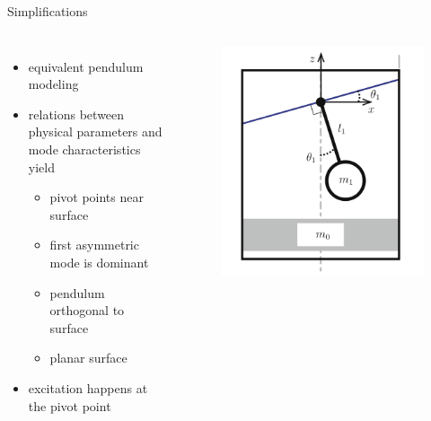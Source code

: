 \documentclass[de]{sdqbeamer}
\begin{document}

\begin{frame}{Simplifications}
    \begin{columns}
        \begin{itemize}
            \item equivalent pendulum modeling
            \item relations between physical parameters and mode characteristics yield
            \begin{itemize}
                \item pivot points near surface
                \item first asymmetric mode is dominant
                \item pendulum orthogonal to surface
                \item planar surface
            \end{itemize} 
            \item excitation happens at the pivot point
        \end{itemize}        
        \begin{figure}
            \centering
            \includegraphics[scale=0.23]{graphics/sloshing_pendulum_simplified.png}
        \end{figure}
    \end{columns}   
\end{frame}
\end{document}
